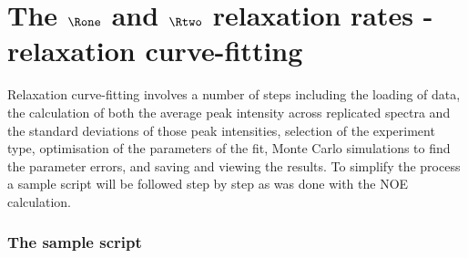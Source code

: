 
\newpage
\section{The $\Rone$ and $\Rtwo$ relaxation rates - relaxation curve-fitting}

Relaxation curve-fitting involves a number of steps including the loading of data, the calculation of both the average peak intensity across replicated spectra and the standard deviations of those peak intensities, selection of the experiment type, optimisation of the parameters of the fit, Monte Carlo simulations to find the parameter errors, and saving and viewing the results.  To simplify the process a sample script will be followed step by step as was done with the NOE calculation.

\subsubsection{The sample script}

